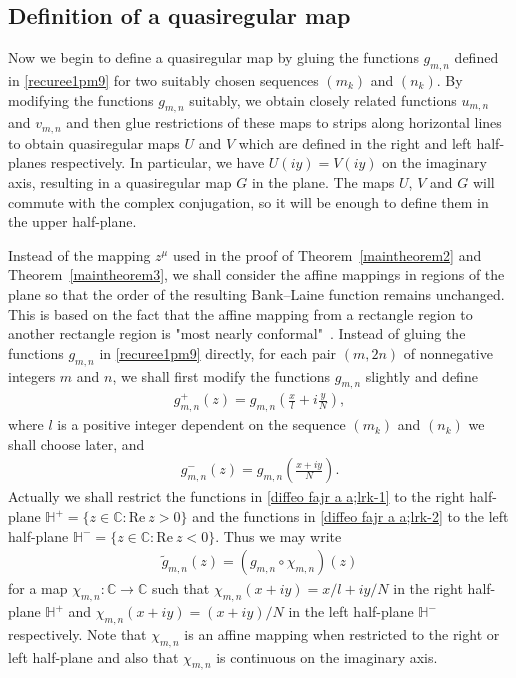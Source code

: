 \documentclass[12pt]{amsart}
\numberwithin{equation}{section}
\begin{document}
\subsection{Definition of a quasiregular map}\label{Definition of a quasiregular map} %

Now we begin to define a quasiregular map by gluing the functions $g_{m,n}$ defined in \eqref{recuree1pm9} for two suitably chosen sequences $(m_k)$ and $(n_k)$. By modifying the functions $g_{m,n}$ suitably, we obtain closely related functions $u_{m,n}$ and $v_{m,n}$ and then glue restrictions of these maps to strips along horizontal lines to obtain quasiregular maps $U$ and $V$ which are defined in the right and left half-planes respectively. In particular, we have $U(iy)=V(iy)$ on the imaginary axis, resulting in a quasiregular map $G$ in the plane. The maps $U$, $V$ and $G$ will commute with the complex conjugation, so it will be enough to define them in the upper half-plane.

Instead of the mapping $z^{\mu}$ used in the proof of Theorem~\ref{maintheorem2} and Theorem~\ref{maintheorem3}, we shall consider the affine mappings in regions of the plane so that the order of the resulting Bank--Laine function remains unchanged. This is based on the fact that the affine mapping from a rectangle region to another rectangle region is "most nearly conformal"~\cite{Ahlfors2006}. Instead of gluing the functions $g_{m,n}$ in \eqref{recuree1pm9} directly, for each pair $(m,2n)$ of nonnegative integers $m$ and $n$, we shall first modify the functions $g_{m,n}$ slightly and define
\begin{equation}\label{diffeo  fajr  a a;lrk-1}
\begin{split}
g^{+}_{m,n}(z)=g_{m,n}\left(\frac{x}{l}+i\frac{y}{N}\right),
\end{split}
\end{equation}
where $l$ is a positive integer dependent on the sequence $(m_k)$ and $(n_k)$ we shall choose later, and
\begin{equation}\label{diffeo  fajr  a a;lrk-2}
\begin{split}
g^{-}_{m,n}(z)=g_{m,n}\left(\frac{x+i y}{N}\right).
\end{split}
\end{equation}
Actually we shall restrict the functions in \eqref{diffeo  fajr  a a;lrk-1} to the right half-plane $\mathbb{H}^+=\{z\in\mathbb{C}: \text{Re}\ z>0\}$ and the functions in \eqref{diffeo  fajr  a a;lrk-2} to the left half-plane $\mathbb{H}^-=\{z\in\mathbb{C}: \text{Re}\ z<0\}$. Thus we may write
\begin{equation}\label{diffeo  fajr  ayt}
\begin{split}
\tilde{g}_{m,n}(z)=(g_{m,n}\circ\chi_{m,n})(z)
\end{split}
\end{equation}
for a map $\chi_{m,n}:\mathbb{C}\to \mathbb{C}$ such that $\chi_{m,n}(x+iy)=x/l+iy/N$ in the right half-plane $\mathbb{H}^+$ and $\chi_{m,n}(x+iy)=(x+iy)/N$ in the left half-plane $\mathbb{H}^-$ respectively. Note that $\chi_{m,n}$ is an affine mapping when restricted to the right or left half-plane and also that $\chi_{m,n}$ is continuous on the imaginary axis.
\end{document}
